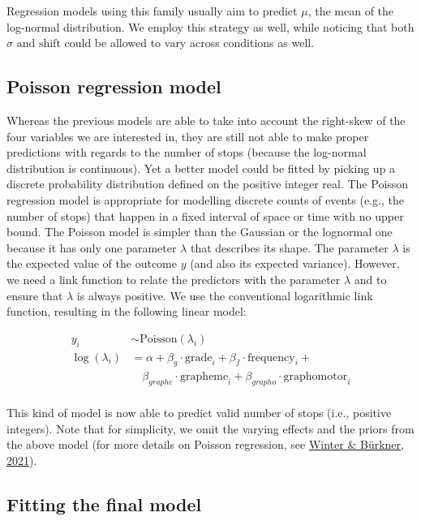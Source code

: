 \documentclass[
  11pt,
  english,
  ,doc,floatsintext]{apa6}
\begin{document}
Regression models using this family usually aim to predict \(\mu\), the mean of the log-normal distribution. We employ this strategy as well, while noticing that both \(\sigma\) and \(\text{shift}\) could be allowed to vary across conditions as well.

\hypertarget{poisson-regression-model}{%
\subsection{Poisson regression model}\label{poisson-regression-model}}

Whereas the previous models are able to take into account the right-skew of the four variables we are interested in, they are still not able to make proper predictions with regards to the number of stops (because the log-normal distribution is continuous). Yet a better model could be fitted by picking up a discrete probability distribution defined on the positive integer real. The Poisson regression model is appropriate for modelling discrete counts of events (e.g., the number of stops) that happen in a fixed interval of space or time with no upper bound. The Poisson model is simpler than the Gaussian or the lognormal one because it has only one parameter \(\lambda\) that describes its shape. The parameter \(\lambda\) is the expected value of the outcome \(y\) (and also its expected variance). However, we need a link function to relate the predictors with the parameter \(\lambda\) and to ensure that \(\lambda\) is always positive. We use the conventional logarithmic link function, resulting in the following linear model:

\[
\begin{aligned}
y_{i} &\sim \mathrm{Poisson}(\lambda_{i})\\
\log(\lambda_{i}) &= \alpha + \beta_{g} \cdot \text{grade}_{i} + \beta_{f} \cdot \text{frequency}_{i} +\\ &\quad  \beta_{graphe} \cdot \text{grapheme}_{i} + \beta_{grapho} \cdot \text{graphomotor}_{i}\\
\end{aligned}
\]

This kind of model is now able to predict valid number of stops (i.e., positive integers). Note that for simplicity, we omit the varying effects and the priors from the above model (for more details on Poisson regression, see \protect\hyperlink{ref-winter_poisson_2021}{Winter \& Bürkner, 2021}).

\hypertarget{fitting-the-final-model}{%
\subsection{Fitting the final model}\label{fitting-the-final-model}}
\end{document}
